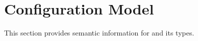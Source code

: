 \section{Configuration Model}
\label{sec:Configuration Model}

This section provides semantic information for  and its types.
















